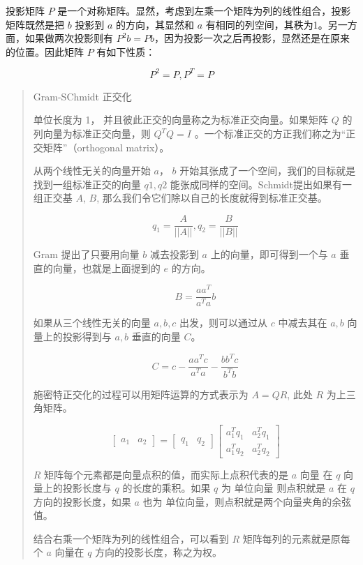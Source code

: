\documentclass[
  letterpaper,
  DIV=11,
  numbers=noendperiod]{scrartcl}
\begin{document}
投影矩阵 \(P\)
是一个对称矩阵。显然，考虑到左乘一个矩阵为列的线性组合，投影矩阵既然是把
\(b\) 投影到 \(a\) 的方向，其显然和 \(a\)
有相同的列空间，其秩为1。另一方面，如果做两次投影则有
\(P^2b = Pb\)，因为投影一次之后再投影，显然还是在原来的位置。因此矩阵
\(P\) 有如下性质：

\[
P^2 = P, P^T = P
\]

\begin{quote}
Gram-SChmidt 正交化

单位长度为 1， 并且彼此正交的向量称之为标准正交向量。如果矩阵 \(Q\)
的列向量为标准正交向量，则 \(Q^TQ = I\)
。一个标准正交的方正我们称之为``正交矩阵''（orthogonal matrix）。

从两个线性无关的向量开始 \(a\)， \(b\)
开始其张成了一个空间，我们的目标就是找到一组标准正交的向量 \(q1, q2\)
能张成同样的空间。Schmidt提出如果有一组正交基 \(A\), \(B\),
那么我们令它们除以自己的长度就得到标准正交基。

\[
q_1 = \frac{A}{||A||}, q_2 = \frac{B}{||B||}
\]

Gram 提出了只要用向量 \(b\) 减去投影到 \(a\) 上的向量，即可得到一个与
\(a\) 垂直的向量，也就是上面提到的 \(e\) 的方向。

\[
B = \frac{aa^T}{a^Ta}b
\]

如果从三个线性无关的向量 \(a, b, c\) 出发，则可以通过从 \(c\) 中减去其在
\(a, b\) 向量上的投影得到与 \(a, b\) 垂直的向量 \(C\)。

\[
C = c - \frac{aa^Tc}{a^Ta} - \frac{bb^Tc}{b^Tb}
\]

施密特正交化的过程可以用矩阵运算的方式表示为 \(A = QR\), 此处 \(R\)
为上三角矩阵。

\[
\begin{bmatrix} a_1 & a_2 \end{bmatrix} = \begin{bmatrix} q_1 & q_2 \end{bmatrix} \begin{bmatrix} a_1^Tq_1 & a_2^Tq_1 \\ a_1^Tq_2 & a_2^Tq_2 \end{bmatrix}
\]

\(R\) 矩阵每个元素都是向量点积的值，而实际上点积代表的是 \(a\) 向量 在
\(q\) 向量上的投影长度与 \(q\) 的长度的乘积。如果 \(q\) 为 单位向量
则点积就是 \(a\) 在 \(q\) 方向的投影长度，如果 \(a\) 也为
单位向量，则点积就是两个向量夹角的余弦值。

结合右乘一个矩阵为列的线性组合，可以看到 \(R\) 矩阵每列的元素就是原每个
\(a\) 向量在 \(q\) 方向的投影长度，称之为权。
\end{quote}
\end{document}
